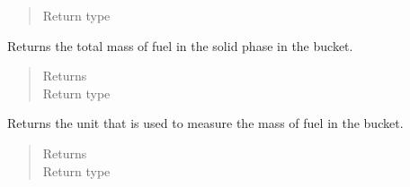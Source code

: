 \documentclass[letterpaper,10pt,openany,oneside,english]{sphinxmanual}
\begin{document}
\begin{fulllineitems}
\begin{fulllineitems}
\begin{quote}
\begin{description}
\item[{Return type}] \leavevmode
{}

\end{description}\end{quote}

\end{fulllineitems}


\begin{fulllineitems}
\label{\detokenize{support_rst/fuel_bucket:fuel_bucket.FuelBucket.get_fuel_mass}}
Returns the total mass of fuel in the solid phase in the bucket.
\begin{quote}\begin{description}
\item[{Returns}] \leavevmode
{}

\item[{Return type}] \leavevmode
{}

\end{description}\end{quote}

\end{fulllineitems}


\begin{fulllineitems}
\label{\detokenize{support_rst/fuel_bucket:fuel_bucket.FuelBucket.get_fuel_mass_unit}}
Returns the unit that is used to measure the mass of fuel in the
bucket.
\begin{quote}\begin{description}
\item[{Returns}] \leavevmode
{}

\item[{Return type}] \leavevmode
{}

\end{description}\end{quote}

\end{fulllineitems}


\end{fulllineitems}
\end{document}
